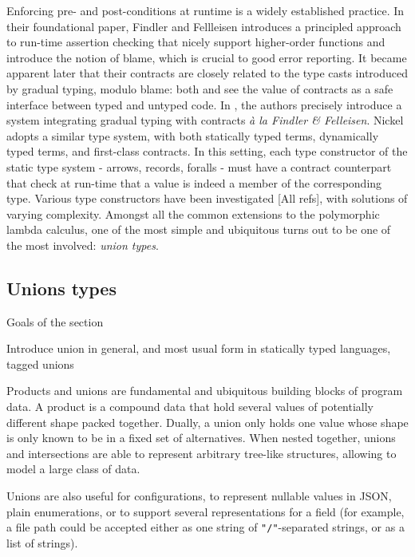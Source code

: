 \documentclass{article}
\begin{document}
Enforcing pre- and post-conditions at runtime is a widely established practice.
In their foundational paper\cite{FindlerFelleisenHOContracts}, Findler and
Fellleisen introduces a principled approach to run-time assertion checking that
nicely support higher-order functions and introduce the notion of blame, which
is crucial to good error reporting. It became apparent later that their
contracts are closely related to the type casts introduced by gradual typing,
modulo blame: both \cite{FindlerMultiLang} and \cite{FelleisenInterLang} see the
value of contracts as a safe interface between typed and untyped code. In
\cite{WellTypedBlamed}, the authors precisely introduce a system integrating
gradual typing with contracts \textit{à la Findler \& Felleisen}. Nickel adopts
a similar type system, with both statically typed terms, dynamically typed
terms, and first-class contracts.  In this setting, each type constructor of the
static type system - arrows, records, foralls - must have a contract counterpart
that check at run-time that a value is indeed a member of the corresponding
type. Various type constructors have been investigated [All refs], with
solutions of varying complexity. Amongst all the common extensions to the
polymorphic lambda calculus, one of the most simple and ubiquitous turns out to
be one of the most involved: \textit{union types}.

\subsection{Unions types}
\color{red}Goals of the section

Introduce union in general, and most usual form in statically typed languages, tagged unions\vspace{0.5cm}\color{black}

Products and unions are fundamental and ubiquitous building blocks of program
data. A product is a compound data that hold several values of potentially
different shape packed together. Dually, a union only holds one value whose
shape is only known to be in a fixed set of alternatives. When nested together,
unions and intersections are able to represent arbitrary tree-like structures,
allowing to model a large class of data.

Unions are also useful for configurations, to represent nullable values in JSON,
plain enumerations, or to support several representations for a field (for
example, a file path could be accepted either as one string of
\lstinline+"/"+-separated strings, or as a list of strings).
\end{document}
